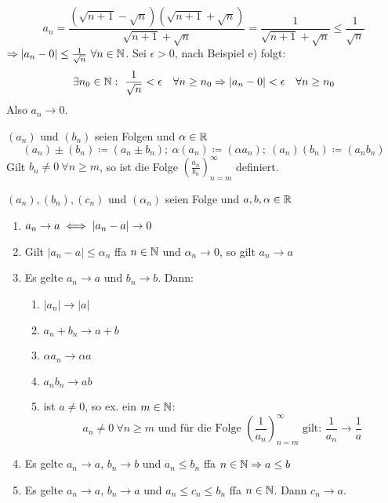 \begin{beispiele*}
\begin{enumerate}
			\begin{beweis}
				$$
					a_{n} = \frac{(\sqrt{n + 1} - \sqrt{n})(\sqrt{n + 1} + \sqrt{n})}{\sqrt{n + 1} + \sqrt{n}} = \frac{1}{\sqrt{n + 1} + \sqrt{n}} \leq \frac{1}{\sqrt{n}}
				$$
				$\Rightarrow |a_{n} - 0| \leq \frac{1}{\sqrt{n}} ~\forall n \in \mathbb{N}$. Sei $\epsilon > 0$, nach Beispiel e) folgt:
				$$
					\exists n_{0} \in \mathbb{N}: ~ \frac{1}{\sqrt{n}} < \epsilon \quad \forall n \geq n_{0} \Rightarrow |a_{n} - 0| < \epsilon \quad \forall n \geq n_{0}
				$$
				Also $a_{n} \rightarrow 0$.
			\end{beweis}
	\end{enumerate}
\end{beispiele*}


\begin{definition*}
	$(a_{n})$ und $(b_{n})$ seien Folgen und $\alpha \in \mathbb{R}$
	$$
		(a_{n}) \pm (b_{n}) \coloneqq (a_{n} \pm b_{n}); ~
		\alpha (a_{n}) \coloneqq (\alpha a_{n}); ~
		(a_{n}) (b_{n}) \coloneqq (a_{n} b_{n}) 		
	$$	
	Gilt $b_{n} \neq 0 ~\forall n \geq m$, so ist die Folge $\left( \frac{a_{n}}{b_{n}} \right)_{n = m}^{\infty}$ definiert.
\end{definition*}


\begin{satz} \label{satz-2.2}
	$(a_{n}),  (b_{n}), (c_{n})$ und $(\alpha_{n})$ seien Folge und $a, b, \alpha \in \mathbb{R}$

	\begin{enumerate}
		\item $a_{n} \rightarrow a \iff |a_{n} - a| \rightarrow 0$
		\item Gilt $|a_{n} - a| \leq \alpha_{n}$ ffa $n \in \mathbb{N}$ und $\alpha_{n} \rightarrow 0$, so gilt $a_{n} \rightarrow a$
		\item Es gelte $a_{n} \rightarrow a$ und $b_{n} \rightarrow b$. Dann:
			\begin{enumerate}
				\item $|a_{n}| \rightarrow |a|$ 
				\item $a_{n} + b_{n} \rightarrow a + b$
				\item $\alpha a_{n} \rightarrow \alpha a$
				\item $a_{n} b_{n} \rightarrow a b$
				\item ist $a \neq 0$, so ex. ein $m \in \mathbb{N}$:
					$$
						a_{n} \neq 0 ~\forall n \geq m \text{ und für die Folge } \left( \frac{1}{a_{n}} \right)_{n = m}^{\infty} \text{ gilt: } \frac{1}{a_{n}} \rightarrow \frac{1}{a}
					$$
			\end{enumerate}
		\item Es gelte $a_{n} \rightarrow a$, $b_{n} \rightarrow b$ und $a_{n} \leq b_{n}$ ffa $n \in \mathbb{N} \Rightarrow a \leq b$
		\item Es gelte $a_{n} \rightarrow a$, $b_{n} \rightarrow a$ und $a_{n} \leq c_{n} \leq b_{n}$ ffa $n \in \mathbb{N}$. Dann $c_{n} \rightarrow a$.
	\end{enumerate}
\end{satz}


